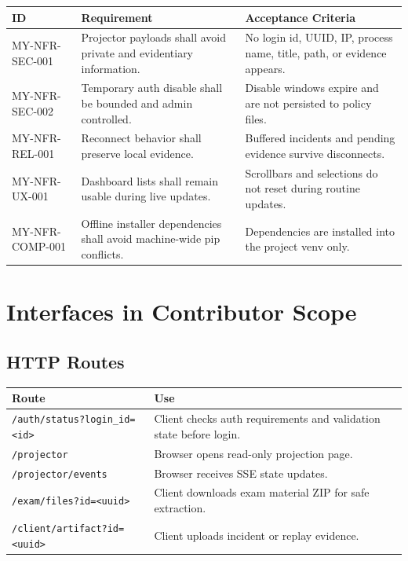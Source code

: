 \documentclass[12pt,a4paper]{article}
\begin{document}
\begin{longtable}{L{0.20\textwidth} L{0.50\textwidth} L{0.20\textwidth}}
\textbf{ID} & \textbf{Requirement} & \textbf{Acceptance Criteria} \\
\hline
MY-NFR-SEC-001 & Projector payloads shall avoid private and evidentiary information. & No login id, UUID, IP, process name, title, path, or evidence appears. \\
MY-NFR-SEC-002 & Temporary auth disable shall be bounded and admin controlled. & Disable windows expire and are not persisted to policy files. \\
MY-NFR-REL-001 & Reconnect behavior shall preserve local evidence. & Buffered incidents and pending evidence survive disconnects. \\
MY-NFR-UX-001 & Dashboard lists shall remain usable during live updates. & Scrollbars and selections do not reset during routine updates. \\
MY-NFR-COMP-001 & Offline installer dependencies shall avoid machine-wide pip conflicts. & Dependencies are installed into the project venv only. \\
\end{longtable}

\section{Interfaces in Contributor Scope}

\subsection{HTTP Routes}

\begin{longtable}{L{0.35\textwidth} L{0.55\textwidth}}
\textbf{Route} & \textbf{Use} \\
\hline
\texttt{/auth/status?login\_id=<id>} & Client checks auth requirements and validation state before login. \\
\texttt{/projector} & Browser opens read-only projection page. \\
\texttt{/projector/events} & Browser receives SSE state updates. \\
\texttt{/exam/files?id=<uuid>} & Client downloads exam material ZIP for safe extraction. \\
\texttt{/client/artifact?id=<uuid>} & Client uploads incident or replay evidence. \\
\end{longtable}
\end{document}
